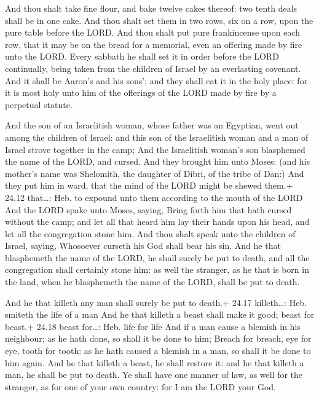  And thou shalt take fine flour, and bake twelve cakes
thereof: two tenth deals shall be in one cake.  And thou
shalt set them in two rows, six on a row, upon the pure table before the
LORD.  And thou shalt put pure frankincense upon each row,
that it may be on the bread for a memorial, even an offering made by
fire unto the LORD.  Every sabbath he shall set it in order
before the LORD continually, being taken from the children of Israel by
an everlasting covenant.  And it shall be Aaron's and his
sons'; and they shall eat it in the holy place: for it is most holy unto
him of the offerings of the LORD made by fire by a perpetual statute.

 And the son of an Israelitish woman, whose father was an
Egyptian, went out among the children of Israel: and this son of the
Israelitish woman and a man of Israel strove together in the camp;
 And the Israelitish woman's son blasphemed the name of the
LORD, and cursed. And they brought him unto Moses: (and his mother's
name was Shelomith, the daughter of Dibri, of the tribe of Dan:)
 And they put him in ward, that the mind of the LORD might
be shewed them.+ 24.12 that\ldots: Heb. to expound unto them according
to the mouth of the LORD  And the LORD spake unto Moses,
saying,  Bring forth him that hath cursed without the camp;
and let all that heard him lay their hands upon his head, and let all
the congregation stone him.  And thou shalt speak unto the
children of Israel, saying, Whosoever curseth his God shall bear his
sin.  And he that blasphemeth the name of the LORD, he
shall surely be put to death, and all the congregation shall certainly
stone him: as well the stranger, as he that is born in the land, when he
blasphemeth the name of the LORD, shall be put to death.

 And he that killeth any man shall surely be put to
death.+ 24.17 killeth\ldots: Heb. smiteth the life of a man
 And he that killeth a beast shall make it good; beast for
beast.+ 24.18 beast for\ldots: Heb. life for life  And if a
man cause a blemish in his neighbour; as he hath done, so shall it be
done to him;  Breach for breach, eye for eye, tooth for
tooth: as he hath caused a blemish in a man, so shall it be done to him
again.  And he that killeth a beast, he shall restore it:
and he that killeth a man, he shall be put to death.  Ye
shall have one manner of law, as well for the stranger, as for one of
your own country: for I am the LORD your God.

